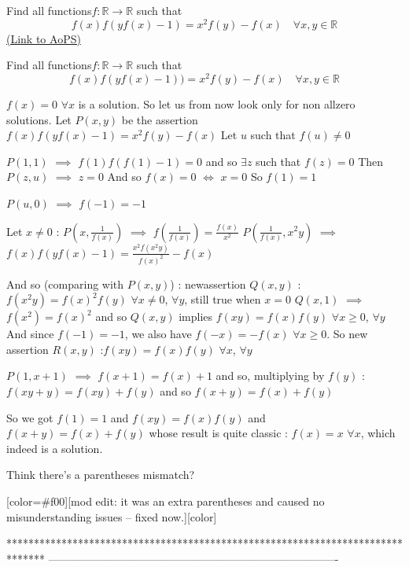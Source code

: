\begin{problem}
	Find all functions$ f:\mathbb R\to\mathbb R$ such that
\[f(x)f(yf(x)-1)=x^2f(y)-f(x) \quad \forall x,y\in\mathbb R\]
	\flushright \href{https://artofproblemsolving.com/community/c6h566423}{(Link to AoPS)}
\end{problem}



\begin{solution}
	\begin{tcolorbox}Find all functions$ f:\mathbb R\to\mathbb R$ such that
\[f(x)f(yf(x)-1))=x^2f(y)-f(x) \quad \forall x,y\in\mathbb R\]\end{tcolorbox}
$\boxed{f(x)=0}$ $\forall x$ is a solution. So let us from now look only for non allzero solutions.
Let $P(x,y)$ be the assertion $f(x)f(yf(x)-1)=x^2f(y)-f(x)$
Let $u$ such that $f(u)\ne 0$

$P(1,1)$ $\implies$ $f(1)f(f(1)-1)=0$ and so $\exists z$ such that $f(z)=0$
Then $P(z,u)$ $\implies$ $z=0$
And so $f(x)=0$ $\iff$ $x=0$
So $f(1)=1$

$P(u,0)$ $\implies$ $f(-1)=-1$

Let $x\ne 0$ : 
$P(x,\frac 1{f(x)})$ $\implies$ $f(\frac 1{f(x)})=\frac{f(x)}{x^2}$
$P(\frac 1{f(x)},x^2y)$ $\implies$ $f(x)f(yf(x)-1)=\frac{x^2f(x^2y)}{f(x)^2}-f(x)$

And so (comparing with $P(x,y)$) : newassertion $Q(x,y)$ : $f(x^2y)=f(x)^2f(y)$ $\forall x\ne 0$, $\forall y$, still true when $x=0$
$Q(x,1)$ $\implies$ $f(x^2)=f(x)^2$ and so $Q(x,y)$ implies $f(xy)=f(x)f(y)$ $\forall x\ge0$, $\forall y$
And since $f(-1)=-1$, we also have $f(-x)=-f(x)$ $\forall x\ge 0$.
So new assertion $R(x,y)$ :$f(xy)=f(x)f(y)$ $\forall x$, $\forall y$

$P(1,x+1)$ $\implies$ $f(x+1)=f(x)+1$ and so, multiplying by $f(y)$ : $f(xy+y)=f(xy)+f(y)$ and so $f(x+y)=f(x)+f(y)$

So we got $f(1)=1$ and $f(xy)=f(x)f(y)$ and $f(x+y)=f(x)+f(y)$ whose result is quite classic : $\boxed{f(x)=x}$ $\forall x$, which indeed is a solution.
\end{solution}



\begin{solution}
	Think there's a parentheses mismatch?

[color=#f00][mod edit: it was an extra parentheses and caused no misunderstanding issues -- fixed now.][\/color]
\end{solution}
*******************************************************************************
-------------------------------------------------------------------------------

